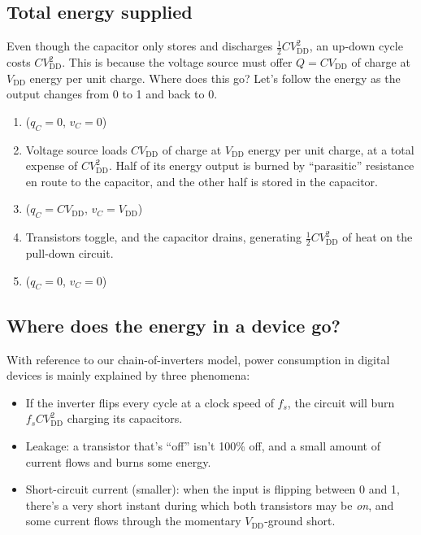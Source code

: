 \subsection{Total energy supplied}
Even though the capacitor only stores and discharges
\(\frac{1}{2}CV_\text{DD}^2\),
an up-down cycle costs \(CV_\text{DD}^2\).
This is because the voltage source must offer \(Q = CV_\text{DD}\) of charge
at \(V_\text{DD}\) energy per unit charge.
Where does this go? Let's follow the energy as the output changes from 0 to 1 and back to 0.
\begin{enumerate}
  \item (\(q_C = 0\), \(v_C = 0\))
  \item Voltage source loads \(CV_\text{DD}\) of charge at \(V_\text{DD}\) energy per unit charge, at a total expense of \(CV_\text{DD}^2\).
  Half of its energy output is burned by ``parasitic'' resistance en route to the capacitor, and the other half is stored in the capacitor.
  \item (\(q_C = CV_\text{DD}\), \(v_C = V_\text{DD}\))
  \item Transistors toggle, and the capacitor drains, generating \(\frac{1}{2} CV_\text{DD}^2\) of heat on the pull-down circuit.
  \item (\(q_C = 0\), \(v_C = 0\))
\end{enumerate}

\subsection{Where does the energy in a device go?}
With reference to our chain-of-inverters model,
power consumption in digital devices is mainly explained by three phenomena:
\begin{itemize}
  \item If the inverter flips every cycle at a clock speed of \(f_s\),
  the circuit will burn \(f_sCV_\text{DD}^2\) charging its capacitors.
  \item Leakage: a transistor that's ``off'' isn't 100\% off, and a small amount of current flows and burns some energy.
  \item Short-circuit current (smaller): when the input is flipping between 0 and 1, there's a very short instant during which both transistors may be \emph{on}, and some current flows through the momentary \(V_\text{DD}\)-ground short.
\end{itemize}
